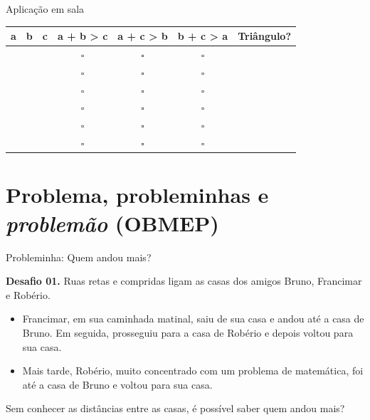 \documentclass[12pt]{beamer}
\begin{document}
    \begin{frame}{Aplicação em sala}
        \begin{table}[h]
        \centering
        \small
        \setlength{\tabcolsep}{8pt}
        \renewcommand{\arraystretch}{1.5}

            \begin{tabular}{|c|c|c||c|c|c||c|}
                \hline
                \textbf{a} & \textbf{b} & \textbf{c} & \textbf{a + b > c} & \textbf{a + c > b} & \textbf{b + c > a} & \textbf{Triângulo?} \\
                \hline
                & & & $\square$ & $\square$ & $\square$ & \\
                \hline
                & & & $\square$ & $\square$ & $\square$ & \\
                \hline
                & & & $\square$ & $\square$ & $\square$ & \\
                \hline
                & & & $\square$ & $\square$ & $\square$ & \\
                \hline
                & & & $\square$ & $\square$ & $\square$ & \\
                \hline
                & & & $\square$ & $\square$ & $\square$ & \\
                \hline
            \end{tabular}
        \end{table}
    \end{frame}

\section{Problema, probleminhas e \textit{problemão} (OBMEP)}


\begin{frame}{Probleminha: Quem andou mais?}

    \begin{exampleblock}{\textbf{Desafio 01.}}
        Ruas retas e compridas ligam as casas dos amigos Bruno, Francimar e Robério.

    \begin{itemize}\justifying
        \item Francimar, em sua caminhada matinal, saiu de sua casa e andou até a casa de Bruno. Em seguida, prosseguiu para a casa de Robério e depois voltou para sua casa.
        \item Mais tarde, Robério, muito concentrado com um problema de matemática, foi até a casa de Bruno e voltou para sua casa.
    \end{itemize} Sem conhecer as distâncias entre as casas, é possível saber quem andou mais?
    
    \end{exampleblock}

\end{frame}
\end{document}

